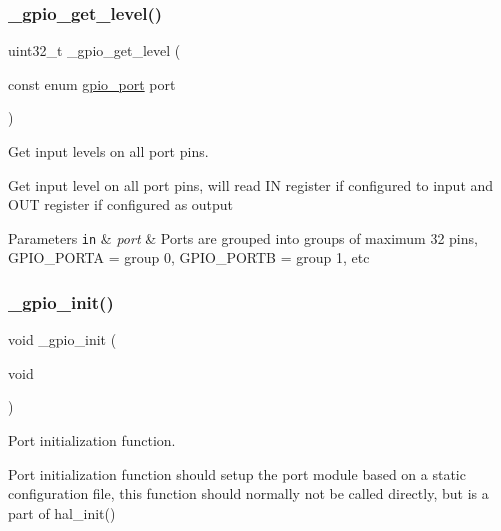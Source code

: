 \subsubsection{\texorpdfstring{\+\_\+gpio\+\_\+get\+\_\+level()}{\_gpio\_get\_level()}}
{\footnotesize\ttfamily uint32\+\_\+t \+\_\+gpio\+\_\+get\+\_\+level (\begin{DoxyParamCaption}\item[{const enum \hyperlink{group___h_p_l_ga6d50d8c4b17ff573c07340d4d7965bc1}{gpio\+\_\+port}}]{port }\end{DoxyParamCaption})}



Get input levels on all port pins. 

Get input level on all port pins, will read IN register if configured to input and O\+UT register if configured as output


\begin{DoxyParams}[1]{Parameters}
\mbox{\tt in}  & {\em port} & Ports are grouped into groups of maximum 32 pins, G\+P\+I\+O\+\_\+\+P\+O\+R\+TA = group 0, G\+P\+I\+O\+\_\+\+P\+O\+R\+TB = group 1, etc \\
\hline
\end{DoxyParams}
\mbox{\label{group___h_p_l_ga6e226919d4a3ee84599b55a32597e284}} 
\subsubsection{\texorpdfstring{\+\_\+gpio\+\_\+init()}{\_gpio\_init()}}
{\footnotesize\ttfamily void \+\_\+gpio\+\_\+init (\begin{DoxyParamCaption}\item[{void}]{ }\end{DoxyParamCaption})}



Port initialization function. 

Port initialization function should setup the port module based on a static configuration file, this function should normally not be called directly, but is a part of hal\+\_\+init() \mbox{\label{group___h_p_l_gad0c9a05c8d3510204e45f6c292e39996}} 
